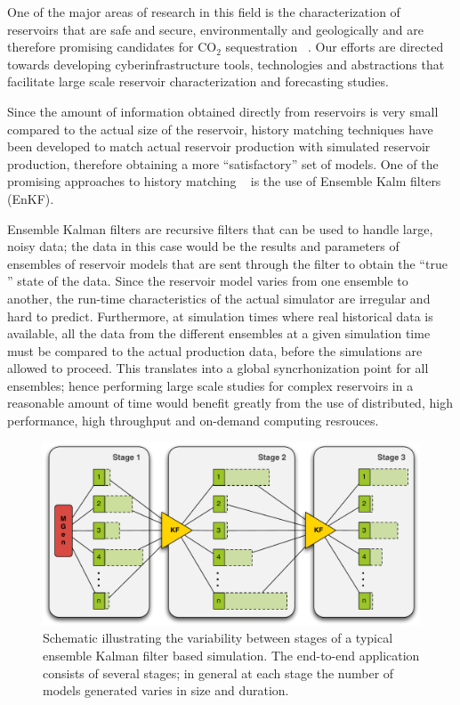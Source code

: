 \documentclass[conference,final]{IEEEtran}
\begin{document}
One of the major areas of research in this field is the characterization of reservoirs that are safe and secure, environmentally 
and geologically and are therefore promising candidates for CO$_2$ sequestration ~\cite{GeoRPT,Luigi}. Our efforts are directed 
towards developing cyberinfrastructure tools, technologies and abstractions that facilitate large scale reservoir characterization 
and forecasting studies.

Since the amount of information obtained directly from reservoirs is very small compared to the actual size of the reservoir, 
history matching techniques have been developed to match actual reservoir production with simulated reservoir production, 
therefore obtaining a more ``satisfactory'' set of models. One of the promising approaches to history matching ~\cite{KalmanPaper, 
DO2007, LiEnKF07, DO2006} is the use of Ensemble Kalm filters (EnKF).

Ensemble Kalman filters are recursive filters that can be used to handle large, noisy data; the data in this case would be the 
results and parameters of ensembles of reservoir models that are sent through the filter to obtain the ``true '' state of the 
data. Since the reservoir model varies from one ensemble to another, the run-time characteristics of the actual simulator are 
irregular and hard to predict. Furthermore, at simulation times where real historical data is available,
all the data from the different ensembles at a given simulation time must be compared to the actual production data, before the 
simulations are allowed to proceed. This translates into a global syncrhonization point for all ensembles; hence performing large 
scale studies for complex reservoirs in a reasonable amount of time would benefit greatly from the use of distributed, high 
performance, high throughput and on-demand computing resrouces.

\begin{figure}
\begin{center}
\includegraphics*[scale=0.33,angle=0]{figures/3StageKalmanFilter}
\end{center}
\caption{Schematic illustrating the variability between stages of a typical
  ensemble Kalman filter based simulation. The end-to-end
  application consists of several stages; in general at each stage the
  number of models generated varies in size and duration.}
\label{fig:irregular_execution}
\end{figure}
\end{document}
